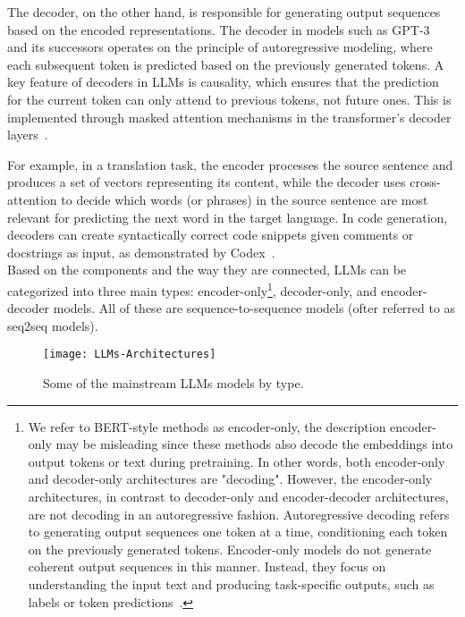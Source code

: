 The decoder, on the other hand, is responsible for generating output sequences based on the encoded representations.
The decoder in models such as GPT-3~\cite{brown2020language} and its successors operates on the principle of autoregressive modeling, where each subsequent token is predicted based on the previously generated tokens.
A key feature of decoders in LLMs is causality, which ensures that the prediction for the current token can only attend to previous tokens, not future ones.
This is implemented through masked attention mechanisms in the transformer's decoder layers~\cite{vaswani2023attention}.

For example, in a translation task, the encoder processes the source sentence and produces a set of vectors representing its content, while the decoder uses cross-attention to decide which words (or phrases) in the source sentence are most relevant for predicting the next word in the target language.
In code generation, decoders can create syntactically correct code snippets given comments or docstrings as input, as demonstrated by Codex~\cite{chen2021evaluating}.\\

Based on the components and the way they are connected, LLMs can be categorized into three main types: encoder-only\footnote{
	We refer to BERT-style methods as encoder-only, the description encoder-only may be misleading since these methods also decode the embeddings into output tokens or text during pretraining.
	In other words, both encoder-only and decoder-only architectures are "decoding". However, the encoder-only architectures, in contrast to decoder-only and encoder-decoder architectures, are not decoding in an autoregressive fashion.
	Autoregressive decoding refers to generating output sequences one token at a time, conditioning each token on the previously generated tokens.
	Encoder-only models do not generate coherent output sequences in this manner.
	Instead, they focus on understanding the input text and producing task-specific outputs, such as labels or token predictions~\cite{raschka2023encoderdecoder}.
},
decoder-only, and encoder-decoder models.
All of these are sequence-to-sequence models (ofter referred to as seq2seq models).

\begin{figure}[H]
	\centering
	\texttt{[image: LLMs-Architectures]}
	\caption{Some of the mainstream LLMs models by type.}
	\label{fig:llms-architectures}
\end{figure}

